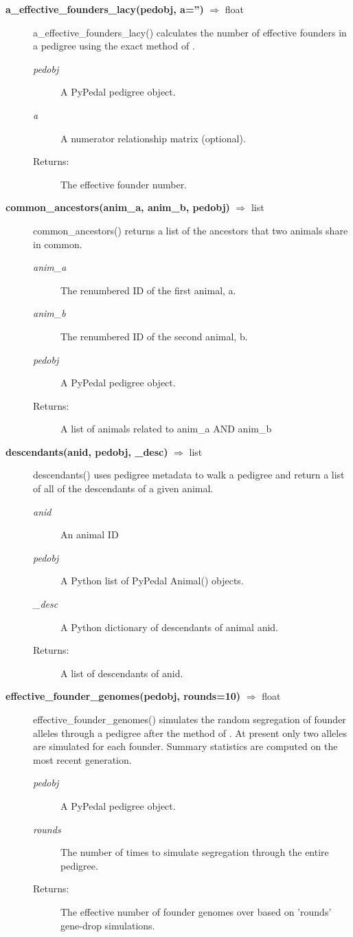\begin{description}
\item[\textbf{a\_effective\_founders\_lacy(pedobj, a='')} $\Rightarrow$ float]
a\_effective\_founders\_lacy() calculates the number of effective founders in a pedigree using the exact method of .
\begin{description}
\item[\emph{pedobj}] A PyPedal pedigree object.
\item[\emph{a}] A numerator relationship matrix (optional).
\item[Returns:] The effective founder number.
\end{description}

\item[\textbf{common\_ancestors(anim\_a, anim\_b, pedobj)} $\Rightarrow$ list]
common\_ancestors() returns a list of the ancestors that two animals share in common.
\begin{description}
\item[\emph{anim\_a}] The renumbered ID of the first animal, a.
\item[\emph{anim\_b}] The renumbered ID of the second animal, b.
\item[\emph{pedobj}] A PyPedal pedigree object.
\item[Returns:] A list of animals related to anim\_a AND anim\_b
\end{description}

\item[\textbf{descendants(anid, pedobj, \_desc)} $\Rightarrow$ list]
descendants() uses pedigree metadata to walk a pedigree and return a list of all of the descendants of a given animal.
\begin{description}
\item[\emph{anid}] An animal ID
\item[\emph{pedobj}] A Python list of PyPedal Animal() objects.
\item[\emph{\_desc}] A Python dictionary of descendants of animal anid.
\item[Returns:] A list of descendants of anid.
\end{description}

\item[\textbf{effective\_founder\_genomes(pedobj, rounds=10)} $\Rightarrow$ float]
effective\_founder\_genomes() simulates the random segregation of founder alleles through a pedigree after the method of . At present only two alleles are simulated for each founder. Summary statistics are computed on the most recent generation.
\begin{description}
\item[\emph{pedobj}] A PyPedal pedigree object.
\item[\emph{rounds}] The number of times to simulate segregation through the entire pedigree.
\item[Returns:] The effective number of founder genomes over based on 'rounds' gene-drop simulations.
\end{description}


\end{description}
